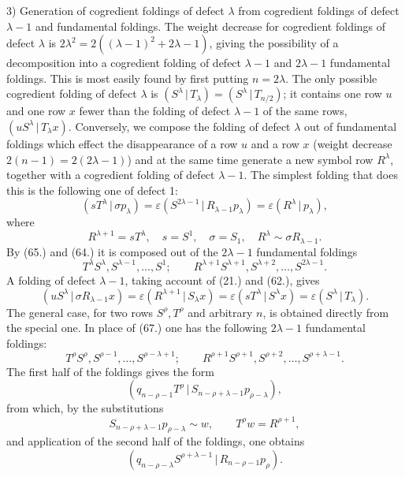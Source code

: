 \documentclass[11pt]{article}
\newcommand{\pair}[2]{(#1\,|\,#2)}
\newcommand{\eps}{\varepsilon}
\begin{document}
3) Generation of cogredient foldings of defect $\lambda$ from cogredient foldings of defect $\lambda-1$ and fundamental foldings. The weight decrease for cogredient foldings of defect $\lambda$ is $2\lambda^2=2((\lambda-1)^2+2\lambda-1)$, giving the possibility of a decomposition into a cogredient folding of defect $\lambda-1$ and $2\lambda-1$ fundamental foldings. This is most easily found by first putting $n=2\lambda$. The only possible cogredient folding of defect $\lambda$ is $\pair{S^\lambda}{T_\lambda}=\pair{S^\lambda}{T_{n/2}}$; it contains one row $u$ and one row $x$ fewer than the folding of defect $\lambda-1$ of the same rows, $\pair{uS^\lambda}{T_\lambda x}$. Conversely, we compose the folding of defect $\lambda$ out of fundamental foldings which effect the disappearance of a row $u$ and a row $x$ (weight decrease $2(n-1)=2(2\lambda-1)$) and at the same time generate a new symbol row $R^\lambda$, together with a cogredient folding of defect $\lambda-1$. The simplest folding that does this is the following one of defect 1:
\[
 \pair{sT^\lambda}{\sigma p_\lambda}=\eps\pair{S^{2\lambda-1}}{R_{\lambda-1}p_\lambda}=\eps\pair{R^\lambda}{p_\lambda},
\]
where
\[
 R^{\lambda+1}=sT^\lambda,
 \quad s=S^1,
 \quad \sigma=S_1,
 \quad R^\lambda\sim\sigma R_{\lambda-1}.
\]
By (65.) and (64.) it is composed out of the $2\lambda-1$ fundamental foldings
\begin{equation}
 T^\lambda S^\lambda,S^{\lambda-1},\ldots,S^1;
 \qquad R^{\lambda+1}S^{\lambda+1},S^{\lambda+2},\ldots,S^{2\lambda-1}.
\tag{67}
\end{equation}
A folding of defect $\lambda-1$, taking account of (21.) and (62.), gives
\[
 \pair{uS^\lambda}{\sigma R_{\lambda-1}x}=\eps\pair{R^{\lambda+1}}{S_\lambda x}
 =\eps\pair{sT^\lambda}{S^\lambda x}=\eps\pair{S^\lambda}{T_\lambda}.
\]
The general case, for two rows $S^\rho,T^\rho$ and arbitrary $n$, is obtained directly from the special one. In place of (67.) one has the following $2\lambda-1$ fundamental foldings:
\begin{equation}
 T^\rho S^\rho,S^{\rho-1},\ldots,S^{\rho-\lambda+1};
 \qquad R^{\rho+1}S^{\rho+1},S^{\rho+2},\ldots,S^{\rho+\lambda-1}.
\tag{68}
\end{equation}
The first half of the foldings gives the form
\[
 \pair{q_{n-\rho-1}T^\rho}{S_{n-\rho+\lambda-1}p_{\rho-\lambda}},
\]
from which, by the substitutions
\[
 S_{n-\rho+\lambda-1}p_{\rho-\lambda}\sim w,
 \qquad T^\rho w=R^{\rho+1},
\]
and application of the second half of the foldings, one obtains
\[
 \pair{q_{n-\rho-\lambda}S^{\rho+\lambda-1}}{R_{n-\rho-1}p_\rho}.
\]
\end{document}
